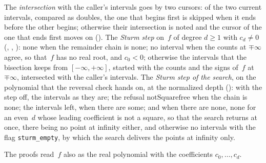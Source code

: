 \begin{definition}
  The \emph{intersection} with the caller's intervals goes by two cursors: of the two current
  intervals, compared as doubles, the one that begins first is skipped when it ends before the other
  begins; otherwise their intersection is noted and the cursor of the one that ends first moves on
  (). The \emph{Sturm step} on~$f$ of degree $d \ge 1$ with $c_d \ne 0$
  (, , ): none when
  the remainder chain is none; no interval when the counts at $\mp\infty$ agree, so that~$f$ has no
  real root, and $c_0 < 0$; otherwise the intervals that the bisection keeps from
  $[-\infty, +\infty]$, started with the counts and the signs of~$f$ at~$\mp\infty$, intersected
  with the caller's intervals. The \emph{Sturm step of the search}, on the polynomial that the
  reversal check hands on, at the normalized depth (): with the
  step off, the intervals as they are; the refusal $\mathrm{notSquarefree}$ when the chain is none;
  the intervals left, when there are some; and when there are none, none for an even~$d$ whose
  leading coefficient is not a square, so that the search returns at once, there being no point at
  infinity either, and otherwise no intervals with the flag \verb|sturm_empty|, by which the search
  delivers the points at infinity only.
\end{definition}

The proofs read~$f$ also as the real polynomial  with the
coefficients $c_0, \dots, c_d$.

